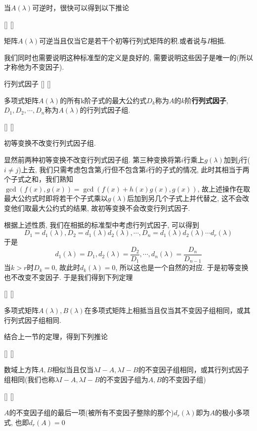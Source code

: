 \documentclass[UTF8]{ctexart}
\begin{document}
        当$A(\lambda)$可逆时，很快可以得到以下推论
        \begin{crl}
			[]
			{}
			[]
			[]
			
            矩阵$A(\lambda)$可逆当且仅当它是若干个初等行列式矩阵的积.或者说与$I$相抵.
        \end{crl}
        我们同时也需要说明这种标准型的定义是良好的, 需要说明这些因子是唯一的(所以才称他为不变因子).
        \begin{dfn}
			[]
			{行列式因子}
			[]
			[]
        
            多项式矩阵$A(\lambda)$的所有k阶子式的最大公约式$D_k$称为$A$的$k$阶\textbf{行列式因子}, $D_1,D_2,\cdots,D_n$称为$A(\lambda)$的行列式因子组.
        \end{dfn}
        \begin{ppt}
			[]
			{}
			[]
			[]
			
            初等变换不改变行列式因子组.
        \end{ppt}
        \begin{prf}
            显然前两种初等变换不改变行列式因子组. 第三种变换将第$i$行乘上$g(\lambda)$加到$j$行($i\neq j$)上去, 
            我们只需考虑包含第$j$行但不包含第$i$行的子式的情况, 此时其相当于两个子式之和，我们熟知$\gcd(f(x),g(x))=\gcd(f(x)+h(x)g(x),g(x))$, 故上述操作在取最大公约式时即将若干个子式乘以$g(\lambda)$后加到另几个子式上并代替之, 这不会改变他们取最大公约式的结果, 故初等变换不会改变行列式因子.
            
        \end{prf}
        根据上述性质, 我们在相抵的标准型中考虑行列式因子, 可以得到\[
        D_1=d_1(\lambda),D_2=d_1(\lambda)d_2(\lambda),\cdots,D_n=d_1(\lambda)d_2(\lambda)\cdots d_r(\lambda)
        \]
        于是\[
        d_1(\lambda)=D_1, d_2(\lambda)=\frac{D_2}{D_1},\cdots,d_n(\lambda)=\frac{D_n}{D_{n-1}}
        \]
        当$k>r$时$D_k=0$, 故此时$d_k(\lambda)=0$, 所以这也是一个自然的对应. 于是初等变换也不改变不变因子. 于是我们得到下列定理
        \begin{thm}
			[]
			{}
			[]
			[]
			
            多项式矩阵$A(\lambda),B(\lambda)$在多项式矩阵上相抵当且仅当其不变因子组相同，或其行列式因子组相同.
        \end{thm}
        结合上一节的定理，得到下列推论
        \begin{crl}
			[]
			{}
			[]
			[]
			
            数域上方阵$A,B$相似当且仅当$\lambda I-A, \lambda I-B$的不变因子组相同，或其行列式因子组相同(我们也称$\lambda I-A, \lambda I-B$的不变因子组为$A,B$的不变因子组)
        \end{crl}
        \begin{thm}
			[]
			{}
			[]
			[]
			
            $A$的不变因子组的最后一项(被所有不变因子整除的那个)$d_r(\lambda)$即为$A$的极小多项式, 也即$d_r(A)=0$
        \end{thm}
        
\end{document}
